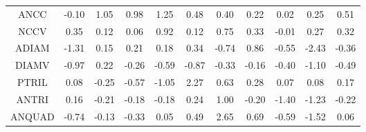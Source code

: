 \documentclass[11pt,a4paper]{report}
\begin{document}
\begin{longtable}{ | c || c | c | c | c | c | c | c | c | c || c |}
ANCC &  \cellcolor[HTML]{FFFFFF} -0.10 &  \cellcolor[HTML]{E7E7FF} 1.05 &  \cellcolor[HTML]{E7E7FF} 0.98 &  \cellcolor[HTML]{DFDFFF} 1.25 &  \cellcolor[HTML]{EFEFFF} 0.48 &  \cellcolor[HTML]{F7F7FF} 0.40 &  \cellcolor[HTML]{F7F7FF} 0.22 &  \cellcolor[HTML]{FFFFFF} 0.02 &  \cellcolor[HTML]{F7F7FF} 0.25 &  \cellcolor[HTML]{EFEFFF} 0.51 \\
NCCV &  \cellcolor[HTML]{F7F7FF} 0.35 &  \cellcolor[HTML]{FFFFFF} 0.12 &  \cellcolor[HTML]{FFFFFF} 0.06 &  \cellcolor[HTML]{E7E7FF} 0.92 &  \cellcolor[HTML]{FFFFFF} 0.12 &  \cellcolor[HTML]{EFEFFF} 0.75 &  \cellcolor[HTML]{F7F7FF} 0.33 &  \cellcolor[HTML]{FFFFFF} -0.01 &  \cellcolor[HTML]{F7F7FF} 0.27 &  \cellcolor[HTML]{F7F7FF} 0.32 \\
ADIAM &  \cellcolor[HTML]{FFDFDF} -1.31 &  \cellcolor[HTML]{FFFFFF} 0.15 &  \cellcolor[HTML]{F7F7FF} 0.21 &  \cellcolor[HTML]{F7F7FF} 0.18 &  \cellcolor[HTML]{F7F7FF} 0.34 &  \cellcolor[HTML]{FFEFEF} -0.74 &  \cellcolor[HTML]{E7E7FF} 0.86 &  \cellcolor[HTML]{FFEFEF} -0.55 &  \cellcolor[HTML]{FFBFBF} -2.43 &  \cellcolor[HTML]{FFF7F7} -0.36 \\
DIAMV &  \cellcolor[HTML]{FFE7E7} -0.97 &  \cellcolor[HTML]{F7F7FF} 0.22 &  \cellcolor[HTML]{FFF7F7} -0.26 &  \cellcolor[HTML]{FFEFEF} -0.59 &  \cellcolor[HTML]{FFE7E7} -0.87 &  \cellcolor[HTML]{FFF7F7} -0.33 &  \cellcolor[HTML]{FFF7F7} -0.16 &  \cellcolor[HTML]{FFF7F7} -0.40 &  \cellcolor[HTML]{FFE7E7} -1.10 &  \cellcolor[HTML]{FFEFEF} -0.49 \\
PTRIL &  \cellcolor[HTML]{FFFFFF} 0.08 &  \cellcolor[HTML]{FFF7F7} -0.25 &  \cellcolor[HTML]{FFEFEF} -0.57 &  \cellcolor[HTML]{FFE7E7} -1.05 &  \cellcolor[HTML]{C7C7FF} 2.27 &  \cellcolor[HTML]{EFEFFF} 0.63 &  \cellcolor[HTML]{F7F7FF} 0.28 &  \cellcolor[HTML]{FFFFFF} 0.07 &  \cellcolor[HTML]{FFFFFF} 0.08 &  \cellcolor[HTML]{F7F7FF} 0.17 \\
ANTRI &  \cellcolor[HTML]{F7F7FF} 0.16 &  \cellcolor[HTML]{FFF7F7} -0.21 &  \cellcolor[HTML]{FFF7F7} -0.18 &  \cellcolor[HTML]{FFF7F7} -0.18 &  \cellcolor[HTML]{F7F7FF} 0.24 &  \cellcolor[HTML]{E7E7FF} 1.00 &  \cellcolor[HTML]{FFF7F7} -0.20 &  \cellcolor[HTML]{FFDFDF} -1.40 &  \cellcolor[HTML]{FFDFDF} -1.23 &  \cellcolor[HTML]{FFF7F7} -0.22 \\
ANQUAD &  \cellcolor[HTML]{FFEFEF} -0.74 &  \cellcolor[HTML]{FFFFFF} -0.13 &  \cellcolor[HTML]{FFF7F7} -0.33 &  \cellcolor[HTML]{FFFFFF} 0.05 &  \cellcolor[HTML]{EFEFFF} 0.49 &  \cellcolor[HTML]{BFBFFF} 2.65 &  \cellcolor[HTML]{EFEFFF} 0.69 &  \cellcolor[HTML]{FFEFEF} -0.59 &  \cellcolor[HTML]{FFD7D7} -1.52 &  \cellcolor[HTML]{FFFFFF} 0.06 \\

\end{longtable}
\end{document}
